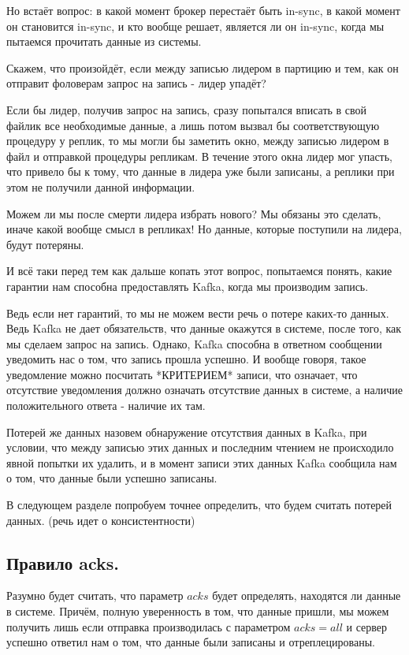 \documentclass[11pt]{article}
\begin{document}
    Но встаёт вопрос: в какой момент брокер перестаёт быть in-sync, в какой момент он становится in-sync, и кто вообще решает, является ли он in-sync, когда мы пытаемся прочитать данные из системы.

    Скажем, что произойдёт, если между записью лидером в партицию и тем, как он отправит фоловерам запрос на запись - лидер упадёт?

    Если бы лидер, получив запрос на запись, сразу попытался вписать в свой файлик все необходимые данные, а лишь потом вызвал бы соответствующую процедуру у реплик, то мы могли бы заметить окно, между записью лидером в файл и отправкой процедуры репликам. В течение этого окна лидер мог упасть, что привело бы к тому, что данные в лидера уже были записаны, а реплики при этом не получили данной информации.

    Можем ли мы после смерти лидера избрать нового? Мы обязаны это сделать, иначе какой вообще смысл в репликах! Но данные, которые поступили на лидера, будут потеряны.

    И всё таки перед тем как дальше копать этот вопрос, попытаемся понять, какие гарантии нам способна предоставлять Kafka, когда мы производим запись.

    Ведь если нет гарантий, то мы не можем вести речь о потере каких-то данных. Ведь Kafka не дает обязательств, что данные окажутся в системе, после того, как мы сделаем запрос на запись. Однако, Kafka способна в ответном сообщении уведомить нас о том, что запись прошла успешно. И вообще говоря, такое уведомление можно посчитать *КРИТЕРИЕМ* записи, что означает, что отсутствие уведомления должно означать отсутствие данных в системе, а наличие положительного ответа - наличие их там.

    Потерей же данных назовем обнаружение отсутствия данных в Kafka, при условии, что между записью этих данных и последним чтением не происходило явной попытки их удалить, и в момент записи этих данных Kafka сообщила нам о том, что данные были успешно записаны.

    В следующем разделе попробуем точнее определить, что будем считать потерей данных. (речь идет о консистентности)

    \subsection{Правило acks.}
    Разумно будет считать, что параметр $acks$ будет определять, находятся ли данные в системе. Причём, полную уверенность в том, что данные пришли, мы можем получить лишь если отправка производилась с параметром $acks=all$ и сервер успешно ответил нам о том, что данные были записаны и отреплецированы.
\end{document}
